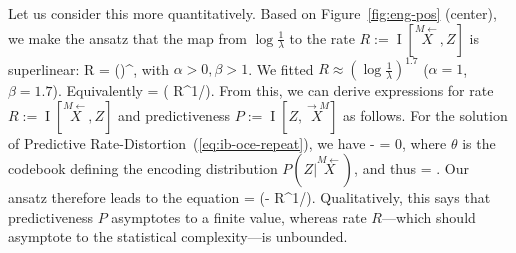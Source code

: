 \documentclass[entropy,article,submit,moreauthors,pdftex,10pt,a4paper]{Definitions/mdpi}
\newcommand{\finitefuture}{\stackrel{\rightarrow \scriptscriptstyle{M}}{X}}
\newcommand{\finitepast}{\stackrel{\scriptscriptstyle{M}\leftarrow}{X}}%
\let\oldequation\equation
\let\oldendequation\endequation
\renewenvironment{equation}
  {\linenomathNonumbers\oldequation}
  {\oldendequation\endlinenomath}
\begin{document}
Let us consider this more quantitatively.
Based on Figure~\ref{fig:eng-pos} (center), we make the ansatz that the map from $\log\frac{1}{\lambda}$ to the rate $R := \operatorname{I}[\finitepast, Z]$ is superlinear:
\begin{equation}\label{eq:r-alpha-beta}
	R = \alpha \left(\log{}\right)^\beta,
\end{equation}
	with $\alpha>0, \beta>1$.
We fitted $R \approx \left(\log\frac{1}{\lambda}\right)^{1.7}$ ($\alpha=1$, $\beta=1.7$).
Equivalently
\begin{equation}
 = \exp\left( R^{1/\beta}\right).
\end{equation}
From this, we can derive expressions for rate $R := \operatorname{I}[\finitepast, Z]$ and predictiveness $P := \operatorname{I}[Z, \finitefuture]$ as follows.
For the solution of Predictive Rate-Distortion~(\ref{eq:ib-oce-repeat}), we have
\begin{equation}
	 - \lambda {} = 0,
\end{equation}
where $\theta$ is the codebook defining the encoding distribution $P(Z|\finitepast)$, and thus
\begin{equation}
\lambda =	.
\end{equation}
Our ansatz therefore leads to the equation
\begin{equation}\label{eq:derivatives}
 = \exp\left(- R^{1/\beta}\right). %
\end{equation}
Qualitatively, this says that predictiveness $P$ asymptotes to a finite value, whereas rate $R$---which should asymptote to the statistical complexity---is unbounded. 
\end{document}
